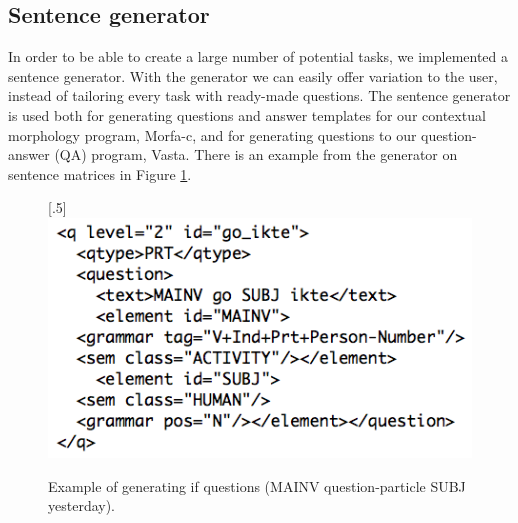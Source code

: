\documentclass[11pt]{article}
\begin{document}

\subsection{Sentence generator}\label{set}
In order to be able to create a large number of potential tasks, we implemented a sentence generator. With the generator we can easily offer variation to the user, instead of tailoring every task with ready-made questions. The sentence generator is used both for generating questions and answer templates for our contextual morphology program, Morfa-c, and for generating questions to our question-answer (QA) program, Vasta. There is an example from the generator on sentence matrices in Figure \ref{questionv}.

\begin{figure}[htbp]
\begin{center}
\scalebox{.5}[.5]{\includegraphics{presentation/img/question_vasta2.png}}\\
\caption{Example of generating if questions (MAINV question-particle SUBJ yesterday).}
\label{questionv}
\end{center}
\end{figure}
\end{document}
